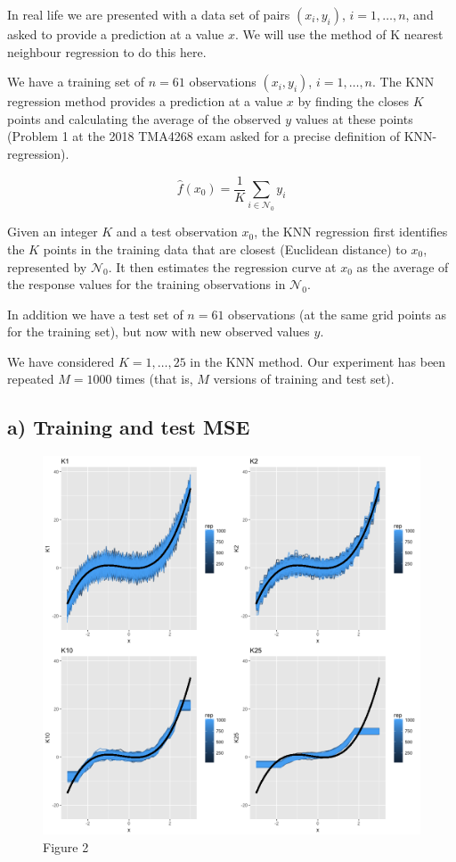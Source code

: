 \documentclass[]{article}
\begin{document}
In real life we are presented with a data set of pairs \((x_i,y_i)\),
\(i=1,\ldots,n\), and asked to provide a prediction at a value \(x\). We
will use the method of K nearest neighbour regression to do this here.

We have a training set of \(n=61\) observations \((x_i,y_i)\),
\(i=1,\ldots,n\). The KNN regression method provides a prediction at a
value \(x\) by finding the closes \(K\) points and calculating the
average of the observed \(y\) values at these points (Problem 1 at the
2018 TMA4268 exam asked for a precise definition of KNN-regression).

\[\hat{f}(x_0)=\frac{1}{K}\sum_{i\in \mathcal{N}_0} y_i\]

Given an integer \(K\) and a test observation \(x_0\), the KNN
regression first identifies the \(K\) points in the training data that
are closest (Euclidean distance) to \(x_0\), represented by
\(\mathcal{N}_0\). It then estimates the regression curve at \(x_0\) as
the average of the response values for the training observations in
\(\mathcal{N}_0\).

In addition we have a test set of \(n=61\) observations (at the same
grid points as for the training set), but now with new observed values
\(y\).

We have considered \(K=1,\ldots,25\) in the KNN method. Our experiment
has been repeated \(M=1000\) times (that is, \(M\) versions of training
and test set).

\hypertarget{a-training-and-test-mse}{%
\subsection{a) Training and test MSE}\label{a-training-and-test-mse}}

\begin{figure}
\centering
\includegraphics{Prob1f2.png}
\caption{Figure 2}
\end{figure}
\end{document}
